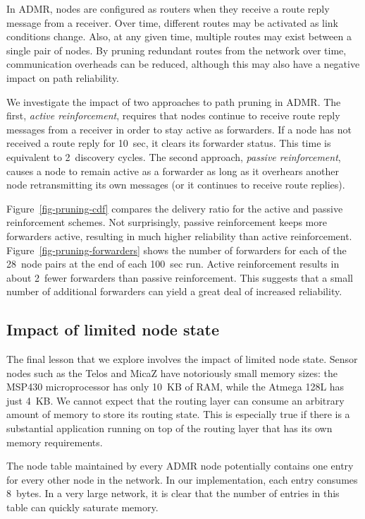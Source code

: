 In ADMR, nodes are configured as routers when they receive
a route reply message from a receiver. Over time, different
routes may be activated as link conditions change. Also,
at any given time, multiple routes may exist between 
a single pair of nodes. By pruning redundant routes from
the network over time, communication overheads can be
reduced, although this may also have a negative impact 
on path reliability.

We investigate the impact of two approaches to path pruning in ADMR. The
first, {\em active reinforcement}, requires that nodes continue to
receive route reply messages from a receiver in order to stay active
as forwarders. If a node has not received a route reply for 
10~sec, it clears its forwarder status. This time is equivalent to 
2~discovery cycles. The second approach, {\em passive reinforcement}, 
causes a node to remain active as a forwarder as long as it overhears 
another node retransmitting its own messages (or it continues to 
receive route replies).

Figure~\ref{fig-pruning-cdf} compares the delivery ratio for
the active and passive reinforcement schemes. Not surprisingly, passive
reinforcement keeps more forwarders active, resulting in much higher
reliability than active reinforcement. 
Figure~\ref{fig-pruning-forwarders} shows the number of
forwarders for each of the 28~node pairs at the end of each
100~sec run. Active reinforcement results in about 2~fewer 
forwarders than passive reinforcement. This suggests 
that a small number of additional forwarders can yield a great deal 
of increased reliability.

\subsection{Impact of limited node state}
\label{sec-tinyadmr-node-state}

The final lesson that we explore involves the impact of limited
node state. Sensor nodes such as the Telos and MicaZ have 
notoriously small memory sizes: the MSP430 microprocessor
has only 10~KB of RAM, while the Atmega 128L has just 4~KB. 
We cannot expect that the routing layer can consume an arbitrary 
amount of memory to store its routing state. This is especially
true if there is a substantial application running on top of
the routing layer that has its own memory requirements.

The node table maintained by every ADMR node potentially
contains one entry for every other node in the network.
In our implementation, each entry consumes 8~bytes.
In a very large network, it is clear that the number of
entries in this table can quickly saturate memory.

